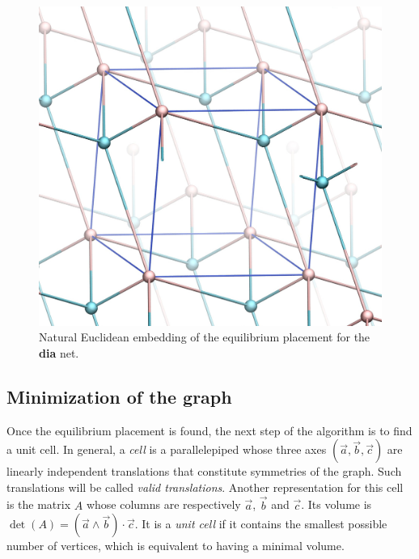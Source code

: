 \documentclass[main.tex]{subfiles}
\begin{document}
\begin{figure}[ht]
	\centering
	\includegraphics[width=0.4\linewidth]{figures/topology/dia.jpg}
	\caption{Natural Euclidean embedding of the equilibrium placement for the {\bf dia} net.}
	\label{diavmd}
\end{figure}



\subsection{Minimization of the graph}

\label{minimization}

Once the equilibrium placement is found, the next step of the algorithm is to find a unit cell. In general, a \emph{cell} is a parallelepiped whose three axes $(\vec a, \vec b, \vec c)$ are linearly independent translations that constitute symmetries of the graph. Such translations will be called \emph{valid translations}. Another representation for this cell is the matrix $A$ whose columns are respectively $\vec a$, $\vec b$ and $\vec c$. Its volume is $\det(A) = (\vec a\wedge\vec b)\cdot\vec c$. It is a \emph{unit cell} if it contains the smallest possible number of vertices, which is equivalent to having a minimal volume. %
\end{document}
